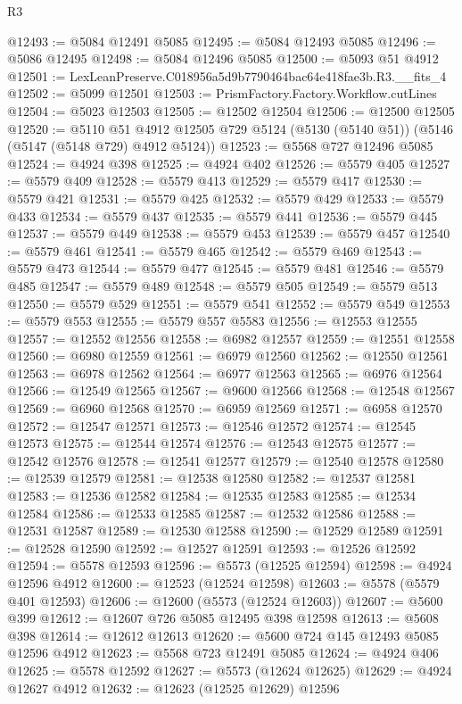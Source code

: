 \begin{lexlean}{R3}
\begin{coremodule}
@12493 := @5084 @12491 @5085
@12495 := @5084 @12493 @5085
@12496 := @5086 @12495
@12498 := @5084 @12496 @5085
@12500 := @5093 @51 @4912
@12501 := LexLeanPreserve.C018956a5d9b7790464bac64e418fae3b.R3.__fits_4
@12502 := @5099 @12501
@12503 := PrismFactory.Factory.Workflow.cutLines
@12504 := @5023 @12503
@12505 := @12502 @12504
@12506 := @12500 @12505
@12520 := @5110
    @51
    @4912
    @12505
    @729
    @5124
    (@5130 (@5140 @51))
    (@5146 (@5147 (@5148 @729) @4912 @5124))
@12523 := @5568 @727 @12496 @5085
@12524 := @4924 @398
@12525 := @4924 @402
@12526 := @5579 @405
@12527 := @5579 @409
@12528 := @5579 @413
@12529 := @5579 @417
@12530 := @5579 @421
@12531 := @5579 @425
@12532 := @5579 @429
@12533 := @5579 @433
@12534 := @5579 @437
@12535 := @5579 @441
@12536 := @5579 @445
@12537 := @5579 @449
@12538 := @5579 @453
@12539 := @5579 @457
@12540 := @5579 @461
@12541 := @5579 @465
@12542 := @5579 @469
@12543 := @5579 @473
@12544 := @5579 @477
@12545 := @5579 @481
@12546 := @5579 @485
@12547 := @5579 @489
@12548 := @5579 @505
@12549 := @5579 @513
@12550 := @5579 @529
@12551 := @5579 @541
@12552 := @5579 @549
@12553 := @5579 @553
@12555 := @5579 @557 @5583
@12556 := @12553 @12555
@12557 := @12552 @12556
@12558 := @6982 @12557
@12559 := @12551 @12558
@12560 := @6980 @12559
@12561 := @6979 @12560
@12562 := @12550 @12561
@12563 := @6978 @12562
@12564 := @6977 @12563
@12565 := @6976 @12564
@12566 := @12549 @12565
@12567 := @9600 @12566
@12568 := @12548 @12567
@12569 := @6960 @12568
@12570 := @6959 @12569
@12571 := @6958 @12570
@12572 := @12547 @12571
@12573 := @12546 @12572
@12574 := @12545 @12573
@12575 := @12544 @12574
@12576 := @12543 @12575
@12577 := @12542 @12576
@12578 := @12541 @12577
@12579 := @12540 @12578
@12580 := @12539 @12579
@12581 := @12538 @12580
@12582 := @12537 @12581
@12583 := @12536 @12582
@12584 := @12535 @12583
@12585 := @12534 @12584
@12586 := @12533 @12585
@12587 := @12532 @12586
@12588 := @12531 @12587
@12589 := @12530 @12588
@12590 := @12529 @12589
@12591 := @12528 @12590
@12592 := @12527 @12591
@12593 := @12526 @12592
@12594 := @5578 @12593
@12596 := @5573 (@12525 @12594)
@12598 := @4924 @12596 @4912
@12600 := @12523 (@12524 @12598)
@12603 := @5578 (@5579 @401 @12593)
@12606 := @12600 (@5573 (@12524 @12603))
@12607 := @5600 @399
@12612 := @12607 @726 @5085 @12495 @398 @12598
@12613 := @5608 @398
@12614 := @12612 @12613
@12620 := @5600 @724 @145 @12493 @5085 @12596 @4912
@12623 := @5568 @723 @12491 @5085
@12624 := @4924 @406
@12625 := @5578 @12592
@12627 := @5573 (@12624 @12625)
@12629 := @4924 @12627 @4912
@12632 := @12623 (@12525 @12629) @12596

\end{coremodule}
\end{lexlean}
